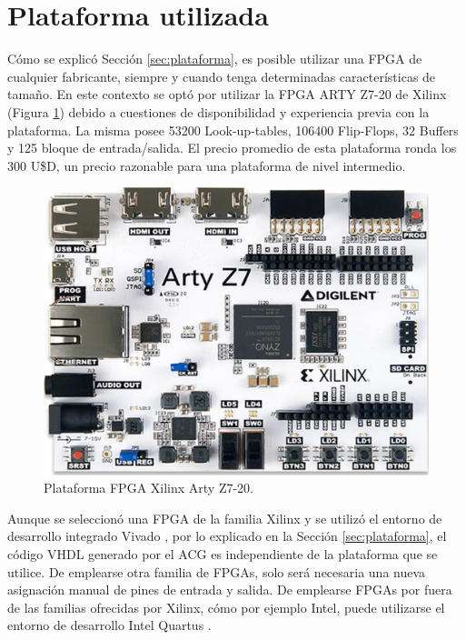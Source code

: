 \section{Plataforma utilizada}
	\label{sec:AGG}
	
	Cómo se explicó Sección \ref{sec:plataforma}, es posible utilizar una FPGA de cualquier fabricante, siempre y cuando tenga determinadas características de tamaño. En este contexto se optó por utilizar la FPGA ARTY Z7-20 de Xilinx (Figura \ref{fig:FPGA}) debido a cuestiones de disponibilidad y experiencia previa con la plataforma. La misma posee 53200 Look-up-tables, 106400 Flip-Flops, 32 Buffers y 125 bloque de entrada/salida. El precio promedio de esta plataforma ronda los 300 U\$D, un precio razonable para una plataforma de nivel intermedio.	
	
	\begin{figure}[H]
		\centering
		\includegraphics[width=1\textwidth]{Figuras/FPGA}
		\centering\caption{Plataforma FPGA Xilinx Arty Z7-20.}
		\label{fig:FPGA}
	\end{figure}
	
	Aunque se seleccionó una FPGA de la familia Xilinx \cite{Paper_30,Paper_36,Paper_37,Paper_40,Paper_41,Paper_47,Paper_97,Paper_104,Paper_106} y se utilizó el entorno de desarrollo integrado Vivado \cite{VIVADO,Paper_111}, por lo explicado en la Sección \ref{sec:plataforma}, el código VHDL generado por el ACG es independiente de la plataforma que se utilice. De emplearse otra familia de FPGAs, solo será necesaria una nueva asignación manual de pines de entrada y salida. De emplearse FPGAs por fuera de las familias ofrecidas por Xilinx, cómo por ejemplo Intel, puede utilizarse el entorno de desarrollo Intel Quartus \cite{QUARTUS}.
	
